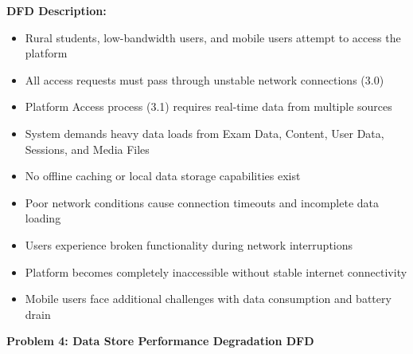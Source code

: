 \documentclass[12pt,a4paper,oneside]{book}
\begin{document}
\textbf{DFD Description:} 
\begin{itemize}
    \item Rural students, low-bandwidth users, and mobile users attempt to access the platform
    \item All access requests must pass through unstable network connections (3.0)
    \item Platform Access process (3.1) requires real-time data from multiple sources
    \item System demands heavy data loads from Exam Data, Content, User Data, Sessions, and Media Files
    \item No offline caching or local data storage capabilities exist
    \item Poor network conditions cause connection timeouts and incomplete data loading
    \item Users experience broken functionality during network interruptions
    \item Platform becomes completely inaccessible without stable internet connectivity
    \item Mobile users face additional challenges with data consumption and battery drain
\end{itemize}

\vspace{0.5cm}
\textbf{Problem 4: Data Store Performance Degradation DFD}
\end{document}
